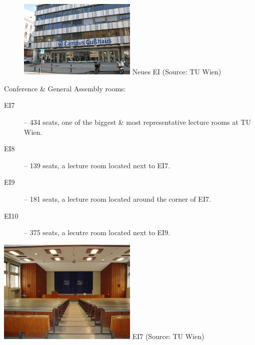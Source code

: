 \documentclass[10pt,a4paper]{article}
\begin{document}
\vspace{10pt}

\begin{figure}
\vspace{-22pt}
\begin{center}
\includegraphics[width=0.5\textwidth]{neues_ei_tuwien.jpg}
\footnotesize{Neues EI (Source: TU Wien)}
\end{center}
\vspace{-16pt}
\end{figure}

Conference \& General Assembly rooms:
\begin{description}
\item[\color{kdedarker} EI7] -- 434 seats, one of the biggest \& most representative lecture rooms at TU Wien.
\item[\color{kdedarker} EI8] -- 139 seats, a lecture room located next to EI7.
\item[\color{kdedarker} EI9] -- 181 seats, a lecture room located around the corner of EI7.
\item[\color{kdedarker} EI10]-- 375 seats, a lecutre room located next to EI9.
\end{description}

\vspace{10pt}
\begin{center}
	\includegraphics[width=0.5\textwidth]{EI7_tuwien.jpg}
	\footnotesize{EI7 (Source: TU Wien)}
\end{center}
\vspace{10pt}
\end{document}
